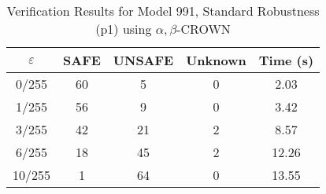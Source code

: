\begin{table}[htbp]
\centering
\caption{Verification Results for Model 991, Standard Robustness (p1) using $\alpha,\beta$-CROWN}
\label{tab:model991_p1_abcrown}
\begin{tabular}{|c|c|c|c|c|}
\hline
$\varepsilon$ & SAFE & UNSAFE & Unknown & Time (s) \\ \hline
0/255 & 60 & 5 & 0 & 2.03 \\ \hline
1/255 & 56 & 9 & 0 & 3.42 \\ \hline
3/255 & 42 & 21 & 2 & 8.57 \\ \hline
6/255 & 18 & 45 & 2 & 12.26 \\ \hline
10/255 & 1 & 64 & 0 & 13.55 \\ \hline
\end{tabular}
\end{table}
